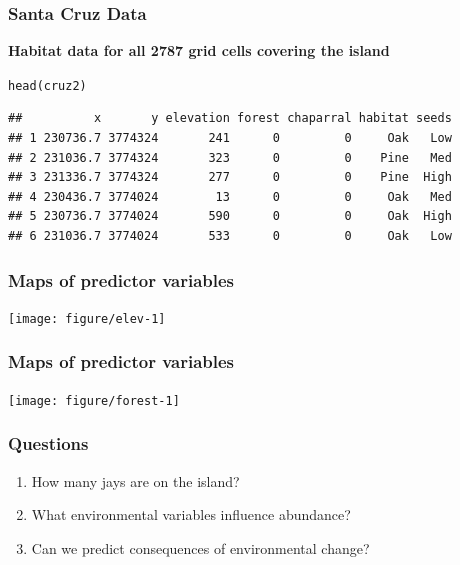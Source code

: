 \documentclass[color=usenames,dvipsnames]{beamer}\usepackage[]{graphicx}\usepackage[]{color}
\makeatletter
\newcommand{\hlstd}[1]{\textcolor[rgb]{0,0,0}{#1}}%
\newcommand{\hlkwd}[1]{\textcolor[rgb]{0.004,0.004,0.506}{#1}}%
\newenvironment{kframe}{%
 \def\at@end@of@kframe{}%
 \ifinner\ifhmode%
  \def\at@end@of@kframe{\end{minipage}}%
  \begin{minipage}{\columnwidth}%
 \fi\fi%
 \def\FrameCommand##1{\hskip\@totalleftmargin \hskip-\fboxsep
 \colorbox{shadecolor}{##1}\hskip-\fboxsep
     \hskip-\linewidth \hskip-\@totalleftmargin \hskip\columnwidth}%
 \MakeFramed {\advance\hsize-\width
   \@totalleftmargin\z@ \linewidth\hsize
   \@setminipage}}%
 {\par\unskip\endMakeFramed%
 \at@end@of@kframe}
\newenvironment{knitrout}{}{} %
\makeatother
\begin{document}
\begin{frame}[fragile]
  \frametitle{Santa Cruz Data}
  \footnotesize


{\bf Habitat data for all 2787 grid cells covering the island}
\begin{knitrout}
\color{fgcolor}\begin{kframe}
\begin{alltt}
\hlkwd{head}\hlstd{(cruz2)}
\end{alltt}
\begin{verbatim}
##          x       y elevation forest chaparral habitat seeds
## 1 230736.7 3774324       241      0         0     Oak   Low
## 2 231036.7 3774324       323      0         0    Pine   Med
## 3 231336.7 3774324       277      0         0    Pine  High
## 4 230436.7 3774024        13      0         0     Oak   Med
## 5 230736.7 3774024       590      0         0     Oak  High
## 6 231036.7 3774024       533      0         0     Oak   Low
\end{verbatim}
\end{kframe}
\end{knitrout}
\end{frame}



\begin{frame}[fragile]
  \frametitle{Maps of predictor variables}
  \scriptsize

\texttt{[image: figure/elev-1]}
\end{frame}




\begin{frame}[fragile]
  \frametitle{Maps of predictor variables}
  \scriptsize

\texttt{[image: figure/forest-1]}
\end{frame}






\begin{frame}
  \frametitle{Questions}
  \large
  \begin{enumerate}[<+- | visible@+->][\bf \color{PineGreen} (1)]
    \item How many jays are on the island?
    \item What environmental variables influence abundance?
    \item Can we predict consequences of environmental change?
  \end{enumerate}
\end{frame}
\end{document}
